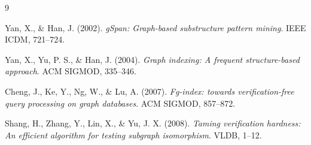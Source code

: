 \documentclass[12pt,a4paper]{article}
\begin{document}
\newpage
\begin{thebibliography}{9}

Yan, X., \& Han, J. (2002).
\textit{gSpan: Graph-based substructure pattern mining}.
IEEE ICDM, 721--724.

Yan, X., Yu, P. S., \& Han, J. (2004).
\textit{Graph indexing: A frequent structure-based approach}.
ACM SIGMOD, 335--346.

Cheng, J., Ke, Y., Ng, W., \& Lu, A. (2007).
\textit{Fg-index: towards verification-free query processing on graph databases}.
ACM SIGMOD, 857--872.

Shang, H., Zhang, Y., Lin, X., \& Yu, J. X. (2008).
\textit{Taming verification hardness: An efficient algorithm for testing subgraph isomorphism}.
VLDB, 1--12.

\end{thebibliography}
\end{document}
